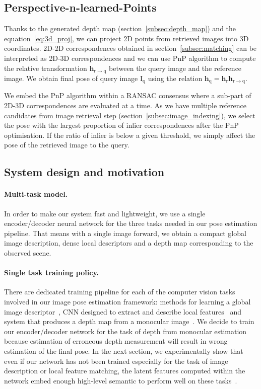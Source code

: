 \subsection{Perspective-n-learned-Points}
\label{subsec:pnlp}
Thanks to the generated depth map (section~\ref{subsec:depth_map}) and the equation~\ref{eq:3d_proj}, we can project 2D points from retrieved images into 3D coordinates. 2D-2D correspondences obtained in section~\ref{subsec:matching} can be interpreted as 2D-3D correspondences and we can use PnP algorithm to compute the relative transformation $\mathbf{h}_\mathrm{r \rightarrow q}$ between the query image and the reference image. We obtain final pose of query image $\mathrm{I_q}$ using the relation $\mathbf{h}_\mathrm{q} = \mathbf{h}_\mathrm{r}\mathbf{h}_\mathrm{r \rightarrow q}$.

We embed the PnP algorithm within a RANSAC consensus where a sub-part of 2D-3D correspondences are evaluated at a time. As we have multiple reference candidates from image retrieval step (section~\ref{subsec:image_indexing}), we select the pose with the largest proportion of inlier correspondences after the PnP optimisation. If the ratio of inlier is below a given threshold, we simply affect the pose of the retrieved image to the query.

\subsection{System design and motivation}
\paragraph{Multi-task model.} In order to make our system fast and lightweight, we use a single encoder/decoder neural network for the three tasks needed in our pose estimation pipeline. That means with a single image forward, we obtain a compact global image description, dense local descriptors and a depth map corresponding to the observed scene.
\paragraph{Single task training policy.} There are dedicated training pipeline for each of the computer vision tasks involved in our image pose estimation framework: methods for learning a global image descriptor~\citep{Arandjelovic2017, Radenovic2017, Gordo2017}, CNN designed to extract and describe local features~\citep{Yi2016a, Rocco2018, Ono2018} and system that produces a depth map from a monocular image~\citep{Eigen2014, Godard2017, Mahjourian2018}. We decide to train our encoder/decoder network for the task of depth from monocular estimation because estimation of erroneous depth measurement will result in wrong estimation of the final pose. In the next section, we experimentally show that even if our network has not been trained especially for the task of image description or local feature matching, the latent features computed within the network embed enough high-level semantic to perform well on these tasks~\citep{Taira2018, Zamir2018}.
